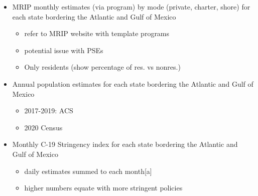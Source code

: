\documentclass[10pt,letterpaper]{article}
\providecommand{\tightlist}{%
  \setlength{\itemsep}{0pt}\setlength{\parskip}{0pt}}
\begin{document}
\begin{itemize}
\tightlist
\item
  MRIP monthly estimates (via program) by mode (private, charter, shore)
  for each state bordering the Atlantic and Gulf of Mexico

  \begin{itemize}
  \tightlist
  \item
    refer to MRIP website with template programs
  \item
    potential issue with PSEs
  \item
    Only residents (show percentage of res. vs nonres.)
  \end{itemize}
\item
  Annual population estimates for each state bordering the Atlantic and
  Gulf of Mexico

  \begin{itemize}
  \tightlist
  \item
    2017-2019: ACS
  \item
    2020 Census
  \end{itemize}
\item
  Monthly C-19 Stringency index for each state bordering the Atlantic
  and Gulf of Mexico

  \begin{itemize}
  \tightlist
  \item
    daily estimates summed to each month{[}a{]}
  \item
    higher numbers equate with more stringent policies
  \end{itemize}
\end{itemize}
\end{document}
